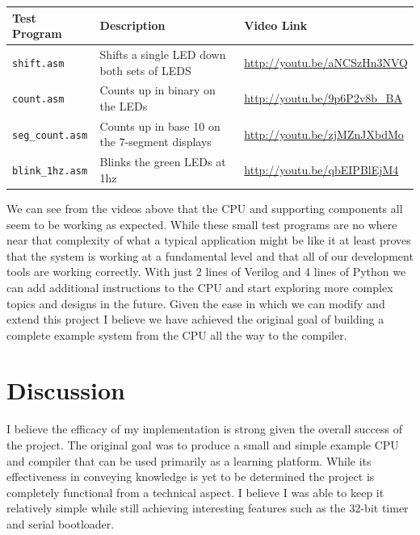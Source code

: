 \documentclass[10pt]{article}
\begin{document}
    \begin{table}[H]
        \centering
        \begin{tabular}{lll}
            \toprule
            \textbf{Test Program} & \textbf{Description} & \textbf{Video Link} \\
            \midrule
            \texttt{shift.asm}      & Shifts a single LED down both sets of LEDS     & \url{http://youtu.be/aNCSzHn3NVQ} \\
            \texttt{count.asm}      & Counts up in binary on the LEDs                & \url{http://youtu.be/9p6P2v8b_BA} \\
            \texttt{seg\_count.asm} & Counts up in base 10 on the 7-segment displays & \url{http://youtu.be/zjMZnJXbdMo} \\
            \texttt{blink\_1hz.asm} & Blinks the green LEDs at 1hz                   & \url{http://youtu.be/qbEIPBlEjM4} \\
            \bottomrule
        \end{tabular}
    \end{table}

    We can see from the videos above that the CPU and supporting components all
    seem to be working as expected. While these small test programs are no
    where near that complexity of what a typical application might be like it
    at least proves that the system is working at a fundamental level and that
    all of our development tools are working correctly. With just 2 lines of
    Verilog and 4 lines of Python we can add additional instructions to the CPU
    and start exploring more complex topics and designs in the future. Given
    the ease in which we can modify and extend this project I believe we have
    achieved the original goal of building a complete example system from the
    CPU all the way to the compiler.

\section{Discussion}

    I believe the efficacy of my implementation is strong given the overall
    success of the project. The original goal was to produce a small and simple
    example CPU and compiler that can be used primarily as a learning platform.
    While its effectiveness in conveying knowledge is yet to be determined the
    project is completely functional from a technical aspect. I believe I was
    able to keep it relatively simple while still achieving interesting
    features such as the 32-bit timer and serial bootloader.
\end{document}
